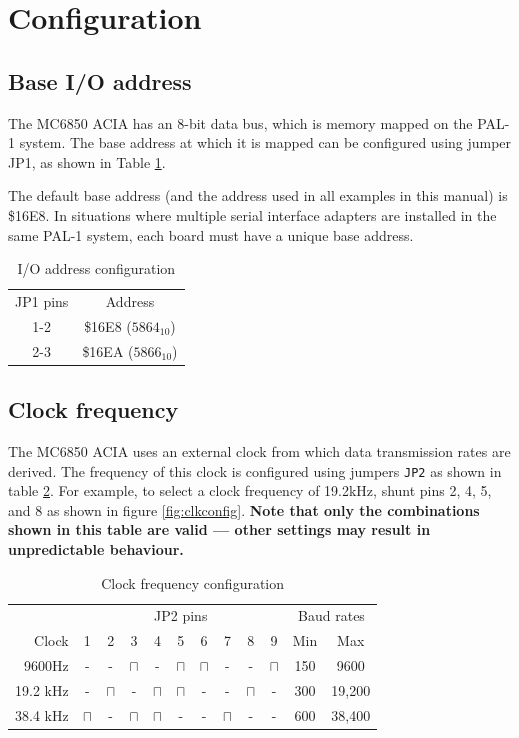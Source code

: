 \documentclass[a4paper,11pt,twoside,openright]{report}
\newcommand{\code}{\texttt}
\begin{document}
\section*{Configuration}
\label{sec:configuration}
\subsection*{Base I/O address}
The MC6850 ACIA has an 8-bit  data bus, which is memory mapped on the PAL-1 system. The base address at which it is mapped can be configured using jumper JP1, as shown in Table \ref{tab:addresses}.

The default base address (and the address used in all examples in this manual) is \$16E8. In situations where multiple serial interface adapters are installed in the same PAL-1 system, each board must have a unique base address. 

\begin{table}[h]
\centering
\begin{tabular}{@{\extracolsep{4pt}}cc@{}}
\hline
JP1 pins & Address \\ 
\cline{1-1}\cline{2-2}
1-2 & \$16E8 ($5864_{10}$) \\
2-3 & \$16EA ($5866_{10}$) \\
\hline
\end{tabular}
\caption[]{I/O address configuration}
\label{tab:addresses}
\end{table}

\subsection*{Clock frequency}
The MC6850 ACIA uses an external clock from which data transmission rates are derived. The frequency of this clock is configured using jumpers \code{JP2} as shown in table \ref{tab:clock}. For example, to select a clock frequency of 19.2kHz, shunt pins 2, 4, 5, and 8 as shown in figure \ref{fig:clkconfig}.  \textbf{Note that only the combinations shown in this table are valid --- other settings may result in unpredictable behaviour.}

\begin{table}[h]
\centering
\begin{tabular}{@{\extracolsep{4pt}}rccccccccccc@{}}
\hline
&\multicolumn{9}{c}{JP2 pins}&\multicolumn{2}{c}{Baud rates}\\
Clock & 1 & 2 & 3 & 4 & 5 & 6 & 7 & 8 & 9 & Min & Max \\ 
 \cline{1-1}\cline{2-10}\cline{11-12}
9600Hz & - & - & $\sqcap$ & - & $\sqcap$ & $\sqcap$ & - & - & $\sqcap$ & 150 & 9600 \\
19.2 kHz & - & $\sqcap$ & - & $\sqcap$ & $\sqcap$ & - & - & $\sqcap$ & - & 300 & 19,200 \\
38.4 kHz & $\sqcap$ & - & $\sqcap$ & $\sqcap$ & - & - & $\sqcap$ & - & - & 600 & 38,400 \\
\hline
\end{tabular}
\caption[]{Clock frequency configuration}
\label{tab:clock}
\end{table}
\end{document}
